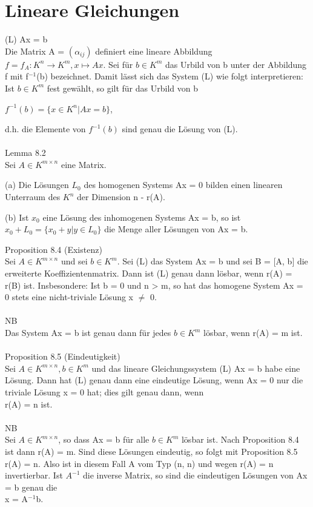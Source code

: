 \documentclass[fontsize=10pt]{scrartcl}
\begin{document}
\section{Lineare Gleichungen}
(L)  Ax = b\\
Die Matrix A = $(\alpha_{ij})$ definiert eine lineare Abbildung $f = f_A: K^n \to K^m, x \mapsto Ax$. Sei für $b \in K^m$ das Urbild von b unter der Abbildung f mit f$^{-1}$(b) bezeichnet. Damit lässt sich das System (L) wie folgt interpretieren: Ist $b \in K^m$ fest gewählt, so gilt für das Urbild von b
\begin{center}
$f^{-1}(b) = \{x \in K^n | Ax = b\}$,
\end{center}
d.h. die Elemente von $f^{-1}(b)$ sind genau die Lösung von (L).\\ 
\\
Lemma 8.2\\
Sei $A \in K^{m \times n}$ eine Matrix.
\begin{compactenum}
\item[(a)] Die Lösungen $L_0$ des homogenen Systems Ax = 0 bilden einen linearen Unterraum des $K^n$ der Dimension n - r(A).
\item[(b)] Ist $x_0$ eine Lösung des inhomogenen Systems Ax = b, so ist $x_0 + L_0 = \{x_0 +y | y \in L_0\}$ die Menge aller Lösungen von Ax = b.\\
\end{compactenum}
Proposition 8.4 (Existenz)\\
Sei $A \in K^{m \times n}$ und sei $b \in K^m$. Sei (L) das System Ax = b und sei B = [A, b] die erweiterte Koeffizientenmatrix. Dann ist (L) genau dann lösbar, wenn r(A) = r(B) ist. Insbesondere: Ist b = 0 und n > m, so hat das homogene System Ax = 0 stets eine nicht-triviale Lösung x $\neq$ 0.\\
\\
NB\\
Das System Ax = b ist genau dann für jedes $b \in K^m$ lösbar, wenn r(A) = m ist.\\
\\
Proposition 8.5 (Eindeutigkeit)\\
Sei $A \in K^{m \times n},b \in K^m$ und das lineare Gleichungssystem (L) Ax = b habe eine Lösung. Dann hat (L) genau dann eine eindeutige Lösung, wenn Ax = 0 nur die triviale Lösung x = 0 hat; dies gilt genau dann, wenn \\r(A) = n ist.\\
\\
NB\\
Sei $A \in K^{m \times n}$, so dass Ax = b für alle $b \in K^m$ lösbar ist. Nach Proposition 8.4 ist dann r(A) = m. Sind diese Lösungen eindeutig, so folgt mit Proposition 8.5 r(A) = n. Also ist in diesem Fall A vom Typ (n, n) und wegen r(A) = n invertierbar. Ist $A^{-1}$ die inverse Matrix, so sind die eindeutigen Lösungen von Ax = b genau die \\x = A$^{-1}$b.\\
\end{document}
